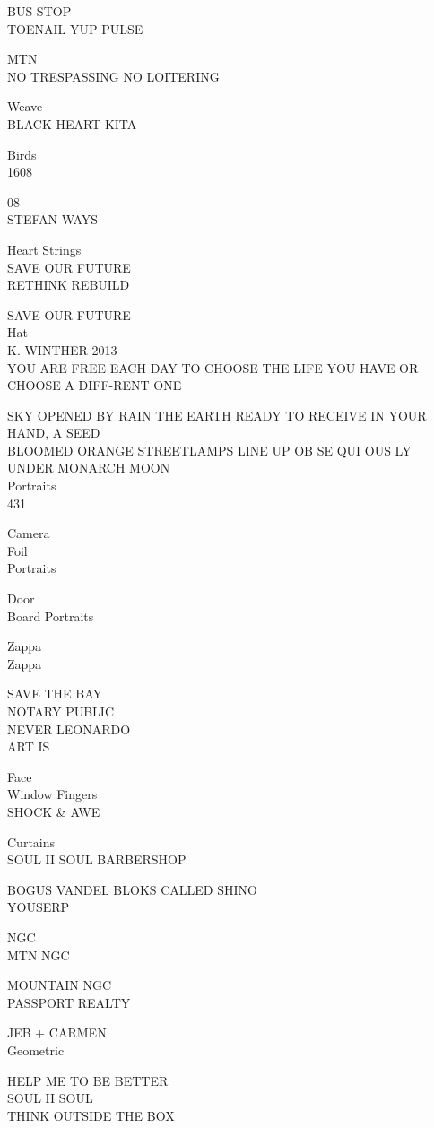 \documentclass[10pt,letterpaper]{article}
\begin{document}
BUS STOP\\
TOENAIL YUP PULSE

MTN\\
NO TRESPASSING NO LOITERING

Weave\\
BLACK HEART KITA

Birds\\
1608

08\\
STEFAN WAYS

Heart Strings\\
SAVE OUR FUTURE\\
RETHINK REBUILD

SAVE OUR FUTURE\\
Hat\\
K. WINTHER 2013\\
YOU ARE FREE EACH DAY TO CHOOSE THE LIFE YOU HAVE OR CHOOSE A DIFF{-}RENT ONE

SKY OPENED BY RAIN THE EARTH READY TO RECEIVE IN YOUR HAND, A SEED\\
BLOOMED ORANGE STREETLAMPS LINE UP OB SE QUI OUS LY UNDER MONARCH MOON\\
Portraits\\
431

Camera\\
Foil\\
Portraits

Door\\
Board Portraits

Zappa\\
Zappa

SAVE THE BAY\\
NOTARY PUBLIC\\
NEVER LEONARDO\\
ART IS

Face\\
Window Fingers\\
SHOCK \& AWE

Curtains\\
SOUL II SOUL BARBERSHOP

BOGUS VANDEL BLOKS CALLED SHINO\\
YOUSERP

NGC\\
MTN NGC

MOUNTAIN NGC\\
PASSPORT REALTY

JEB + CARMEN\\
Geometric

HELP ME TO BE BETTER\\
SOUL II SOUL\\
THINK OUTSIDE THE BOX
\end{document}
